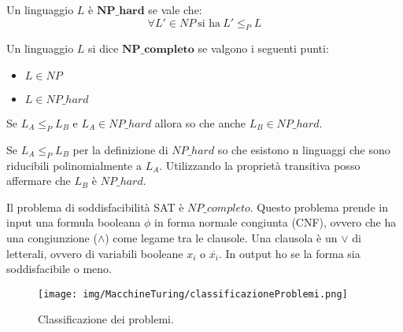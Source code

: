 \begin{definizione}
    Un linguaggio $L$ è $\textbf{NP}\_\textbf{hard}$ se vale che:
    \begin{equation}
        \forall L' \in NP \ \text{si ha} \ L' \leq_P L
    \end{equation}
\end{definizione}
\begin{definizione}
    Un linguaggio $L$ si dice $\textbf{NP}\_\textbf{completo}$ se valgono i
    seguenti punti:
    \begin{itemize}
        \item $L \in NP$
        \item $L \in NP\_hard$
    \end{itemize}
\end{definizione}
\begin{teorema}
    Se $L_A \leq_P L_B$ e $L_A \in NP\_hard$ allora so che anche $L_B \in NP\_hard$.
\end{teorema}
\begin{dimostrazione}
    Se $L_A \leq_P L_B$ per la definizione di $NP\_hard$ so che esistono n linguaggi
    che sono riducibili polinomialmente a $L_A$. Utilizzando la proprietà transitiva
    posso affermare che $L_B$ è $NP\_hard$.
\end{dimostrazione}
\begin{teorema}
    Il problema di soddisfacibilità SAT è $NP\_completo$. Questo problema prende
    in input una formula booleana $\phi$ in forma normale congiunta (CNF), ovvero
    che ha una congiunzione ($\land$) come legame tra le clausole. Una clausola
    è un $\lor$ di letterali, ovvero di variabili booleane $x_i$ o $\overline{x_i}$.
    In output ho se la forma sia soddisfacibile o meno.
\end{teorema}
\begin{figure}[!ht]
    \centering
    \texttt{[image: img/MacchineTuring/classificazioneProblemi.png]}
    \caption{Classificazione dei problemi.}
\end{figure}